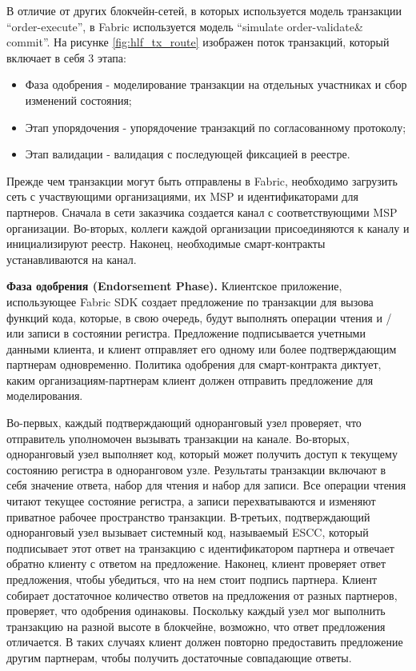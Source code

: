 В отличие от других блокчейн-сетей, в которых используется модель транзакции “order-execute”, в Fabric используется модель “simulate order-validate\& commit”. На рисунке \ref{fig:hlf_tx_route} изображен поток транзакций, который включает в себя 3 этапа:
\begin{itemize}
	\item Фаза одобрения - моделирование транзакции на отдельных участниках и сбор изменений состояния;
	\item Этап	упорядочения	-	упорядочение транзакций по согласованному протоколу;
	\item Этап валидации - валидация с последующей фиксацией в реестре.
\end{itemize}

Прежде чем транзакции могут быть отправлены в Fabric, необходимо загрузить сеть с участвующими организациями, их MSP и идентификаторами для партнеров. Сначала в сети заказчика создается канал с соответствующими MSP организации. Во-вторых, коллеги каждой организации присоединяются к каналу и инициализируют реестр. Наконец, необходимые смарт-контракты устанавливаются на канал.


\textbf{Фаза одобрения (Endorsement Phase).} Клиентское приложение, использующее Fabric SDK создает предложение по транзакции для вызова функций кода, которые, в свою очередь, будут выполнять операции чтения и
/ или записи в состоянии регистра. Предложение подписывается учетными данными клиента, и клиент отправляет его одному или более подтверждающим партнерам одновременно. Политика одобрения для смарт-контракта диктует, каким организациям-партнерам клиент должен отправить предложение для моделирования.

Во-первых, каждый подтверждающий одноранговый узел проверяет, что отправитель уполномочен вызывать транзакции на канале. Во-вторых, одноранговый узел выполняет код, который может получить доступ к текущему состоянию регистра в одноранговом узле. Результаты транзакции включают в себя значение ответа, набор для чтения и набор для записи. Все операции чтения читают текущее состояние регистра, а записи перехватываются и изменяют приватное рабочее пространство транзакции. В-третьих, подтверждающий одноранговый узел вызывает системный код, называемый ESCC, который подписывает этот ответ на транзакцию с идентификатором партнера и отвечает обратно клиенту с ответом на предложение. Наконец, клиент проверяет ответ предложения, чтобы убедиться, что на нем стоит подпись партнера. Клиент собирает достаточное количество ответов на предложения от разных партнеров, проверяет, что одобрения одинаковы. Поскольку каждый узел мог выполнить транзакцию на разной высоте в блокчейне, возможно, что ответ предложения отличается. В таких случаях клиент должен повторно предоставить предложение другим партнерам, чтобы получить достаточные совпадающие ответы.

